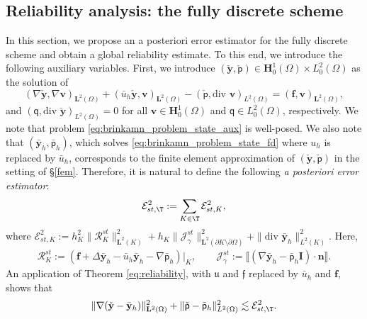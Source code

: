 \documentclass[final]{siamart0216}
\begin{document}

\subsection{Reliability analysis: the fully discrete scheme} 
\label{Real:fully_discrete} 
In this section, we propose an a posteriori error estimator for the fully discrete scheme and obtain a global reliability estimate. To this end, we introduce the following auxiliary variables. First, we introduce $(\check{\mathbf{y}},\check{\mathsf{p}})\in \mathbf{H}_0^1(\Omega)\times L_0^2(\Omega)$ as the solution of
\begin{equation}\label{eq:brinkamn_problem_state_aux}
(\nabla \check{\mathbf{y}},\nabla \mathbf{v})_{\mathbf{L}^2(\Omega)}+( \bar{u}_{h}\check{\mathbf{y}}, \mathbf{v})_{\mathbf{L}^2(\Omega)}-(\check{\mathsf{p}},\text{div }\mathbf{v})_{L^2(\Omega)} = 	(\mathbf{f},\mathbf{v})_{\mathbf{L}^2(\Omega)},
\end{equation}
and $(\mathsf{q},\text{div }\check{\mathbf{y}})_{L^2(\Omega)}  = 0$ for all $\mathbf{v} \in \mathbf{H}_0^1(\Omega)$ and $\mathsf{q} \in L_0^2(\Omega)$, respectively. We note that problem \eqref{eq:brinkamn_problem_state_aux} is well-posed. We also note that $(\bar{\mathbf{y}}_{h},\bar{\mathsf{p}}_{h})$, which solves \eqref{eq:brinkamn_problem_state_fd} where $u_{h}$ is replaced by $\bar{u}_{h}$, corresponds to the finite element approximation of $(\check{\mathbf{y}},\check{\mathsf{p}})$ in the setting of \S\ref{fem}. Therefore, it is natural to define the following \emph{a posteriori error estimator}:
\begin{equation}\label{eq:estimator_st}
\mathcal{E}_{st,\T}^2:= \sum_{K\in\T}\mathcal{E}_{st,K}^2,
\end{equation}
where $\mathcal{E}_{st,K}^2:=h_K^2  \|\mathcal{R}_{K}^{st}\|_{\mathbf{L}^2(K)}^2
+h_K  \|\mathcal{J}_{\gamma}^{st}\|_{\mathbf{L}^2(\partial K\setminus\partial \Omega)}^2
+\|\text{div }\bar{\mathbf{y}}_{h}\|_{L^2(K)}^2$. Here,
\begin{align}\label{eq:residual_state}
\mathcal{R}_{K}^{st}:=(\mathbf{f}+\Delta \bar{\mathbf{y}}_{h}-\bar{u}_{h}\bar{\mathbf{y}}_{h}-\nabla\bar{\mathsf{p}}_{h})|_K,
\qquad 
\mathcal{J}_{\gamma}^{st}:=\llbracket(\nabla \bar{\mathbf{y}}_{h}-\bar{\mathsf{p}}_{h}\mathbf{I})\cdot \mathbf{n}\rrbracket.
\end{align}
An application of Theorem \ref{eq:reliability}, with $\mathfrak{u}$ and $\boldsymbol{\mathfrak{f}}$ replaced by $\bar{u}_{h}$ and $\mathbf{f}$, shows that
\begin{align}\label{eq:bound_realiability_1}
\|\nabla(\check{\mathbf{y}}-\bar{\mathbf{y}}_{h})\|_{\mathbf{L}^2(\Omega)}^2+\|\check{\mathsf{p}}-\bar{\mathsf{p}}_{h}\|_{L^2(\Omega)}^2\lesssim \mathcal{E}_{st,\T}^2.
\end{align}
\end{document}
